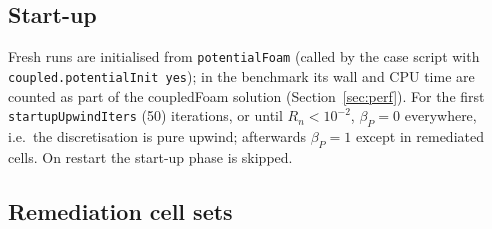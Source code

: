 \documentclass[11pt,a4paper]{article}
\newcommand{\code}[1]{\texttt{#1}}
\begin{document}
\subsection{Start-up}\label{sec:startup}

Fresh runs are initialised from \code{potentialFoam} (called by the case
script with \code{coupled.potentialInit yes}); in the benchmark its wall and
CPU time are counted as part of the coupledFoam solution
(Section~\ref{sec:perf}). For the first \code{startupUpwindIters} (50) iterations, or until
$R_n<10^{-2}$, $\beta_P=0$ everywhere, i.e.\ the discretisation is pure upwind;
afterwards $\beta_P=1$ except in remediated cells. On restart the start-up
phase is skipped.

\subsection{Remediation cell sets}\label{sec:remediation}
\end{document}
